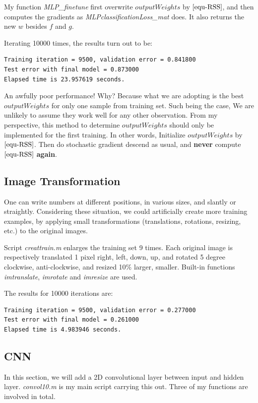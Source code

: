 \documentclass{article}
\begin{document}
My function \emph{MLP\_finetune} first overwrite $outputWeights$ by $\eqref{equ-RSS}$, and then computes the gradients as \emph{MLPclassificationLoss\_mat} does. It also returns the new $w$ besides $f$ and $g$.

Iterating 10000 times, the results turn out to be:
\begin{verbatim}
Training iteration = 9500, validation error = 0.841800
Test error with final model = 0.873000
Elapsed time is 23.957619 seconds.
\end{verbatim}

An awfully poor performance! Why? Because what we are adopting is the best $outputWeights$ for only one sample from training set. Such being the case, We are unlikely to assume they work well for any other observation. From my perspective, this method to determine $outputWeights$ should only be implemented for the first training. In other words, Initialize $outputWeights$ by $\eqref{equ-RSS}$. Then do stochastic gradient descend as usual, and \textbf{never} compute $\eqref{equ-RSS}$ \textbf{again}.

\subsection{Image Transformation}
One can write numbers at different positions, in various sizes, and slantly or straightly. Considering these situation, we could artificially create more training examples, by applying small transformations (translations, rotations, resizing, etc.) to the original images.

Script \emph{creattrain.m} enlarges the training set 9 times. Each original image is respectively translated 1 pixel right, left, down, up, and rotated 5 degree clockwise, anti-clockwise, and resized 10\% larger, smaller. Built-in functions \emph{imtranslate}, \emph{imrotate} and \emph{imresize} are used.

The results for 10000 iterations are:
\begin{verbatim}
Training iteration = 9500, validation error = 0.277000
Test error with final model = 0.261000
Elapsed time is 4.983946 seconds.
\end{verbatim}

\subsection{CNN}
In this section, we will add a 2D convolutional layer between input and hidden layer.
\emph{convol10.m} is my main script carrying this out. Three of my functions are involved in total.
\end{document}
